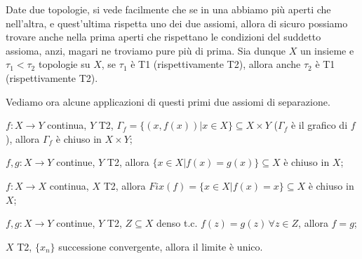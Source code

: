 \begin{prop}
  Date due topologie, si vede facilmente che se in una abbiamo più aperti che nell'altra, e quest'ultima rispetta uno dei due assiomi, allora di sicuro possiamo trovare anche nella prima aperti che rispettano le condizioni del suddetto assioma, anzi, magari ne troviamo pure più di prima. Sia dunque $X$ un insieme e $\tau_1< \tau_2$ topologie su $X$, se $\tau_1$ è T1 (rispettivamente T2), allora anche $\tau_2$ è T1 (rispettivamente T2).
\end{prop}

Vediamo ora alcune applicazioni di questi primi due assiomi di separazione.

\begin{nlist}
  \item $f: X \rightarrow Y$ continua, $Y$ T2, $\Gamma_f=\{ (x, f(x)) | x \in X\} \subseteq X \times Y$ ($\Gamma_f$ è il grafico di $f$), allora $\Gamma_f$ è chiuso in $X \times Y$;
  \item $f, g: X \rightarrow Y$ continue, $Y$ T2, allora $\{ x \in X | f(x)=g(x) \} \subseteq X$ è chiuso in $X$;
  \item $f:X \rightarrow X$ continua, $X$ T2, allora $Fix(f) = \{ x \in X | f(x)=x \} \subseteq X$ è chiuso in $X$;
  \item $f, g:X \rightarrow Y$ continue, $Y$ T2, $Z \subseteq X$ denso t.c. $f(z)=g(z) \, \forall z \in Z$, allora $f=g$;
  \item $X$ T2, $\{x_n\}$ successione convergente, allora il limite è unico.
\end{nlist}

